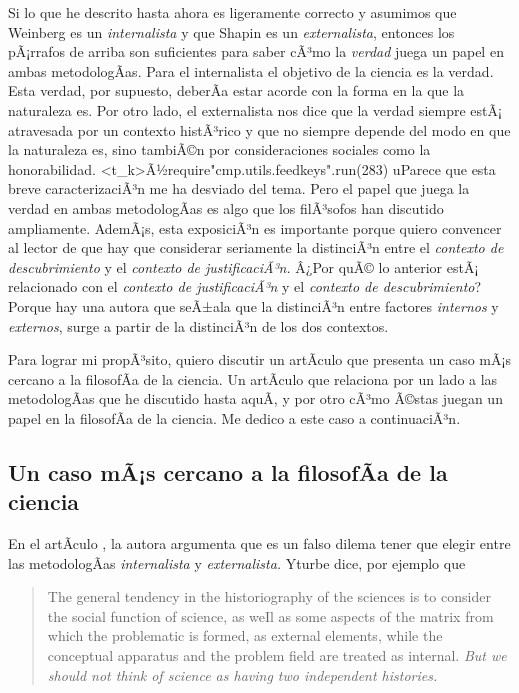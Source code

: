 Si lo que he descrito hasta ahora es ligeramente correcto y asumimos que Weinberg es un \emph{internalista} y que Shapin es un \emph{externalista}, entonces los pÃ¡rrafos de arriba son suficientes para saber cÃ³mo la \emph{verdad} juega un papel en ambas metodologÃ­as.
Para el internalista el objetivo de la ciencia es la verdad.
Esta verdad, por supuesto, deberÃ­a estar acorde con la forma en la que la naturaleza es.
Por otro lado, el externalista nos dice que la verdad siempre estÃ¡
atravesada por un contexto histÃ³rico y que no siempre depende del modo en
que la naturaleza es, sino tambiÃ©n por consideraciones sociales como la
honorabilidad. <t_k>Ã½require"cmp.utils.feedkeys".run(283) uParece que
esta breve caracterizaciÃ³n me ha desviado del tema. Pero el papel que
juega la verdad en ambas metodologÃ­as es algo que los filÃ³sofos han
discutido ampliamente. AdemÃ¡s, esta exposiciÃ³n es importante porque
quiero convencer al lector de que hay que considerar seriamente la
distinciÃ³n entre el \emph{contexto de descubrimiento} y el \emph{contexto
de justificaciÃ³n.} Â¿Por quÃ© lo anterior estÃ¡ relacionado con el
\emph{contexto de justificaciÃ³n} y el \emph{contexto de descubrimiento}?
Porque hay una autora que seÃ±ala que la distinciÃ³n entre factores
\emph{internos} y \emph{externos}, surge a partir de la distinciÃ³n de los
dos contextos.

Para lograr mi propÃ³sito, quiero discutir un artÃ­culo que presenta un caso mÃ¡s cercano a la filosofÃ­a de la ciencia.
Un artÃ­culo que relaciona por un lado a las metodologÃ­as que he discutido hasta aquÃ­, y por otro cÃ³mo Ã©stas juegan un papel en la filosofÃ­a de la ciencia.
Me dedico a este caso a continuaciÃ³n.

\subsection{Un caso mÃ¡s cercano a la filosofÃ­a de la ciencia}\label{sbc:yturbe}

\noindent En el artÃ­culo , la autora argumenta que es un falso dilema tener que elegir entre las metodologÃ­as \emph{internalista} y \emph{externalista.}
Yturbe dice, por ejemplo que

\begin{quote}
	The general tendency in the historiography of the sciences is to consider the social function of science, as weIl as some aspects of the matrix from which the problematic is formed, as external elements, while the conceptual apparatus and the problem field are treated as internal. \emph{But we should not think of science as having two independent histories.} \parencite[p.85, Ãnfasis agregado]{Yturbe1995}
\end{quote}

